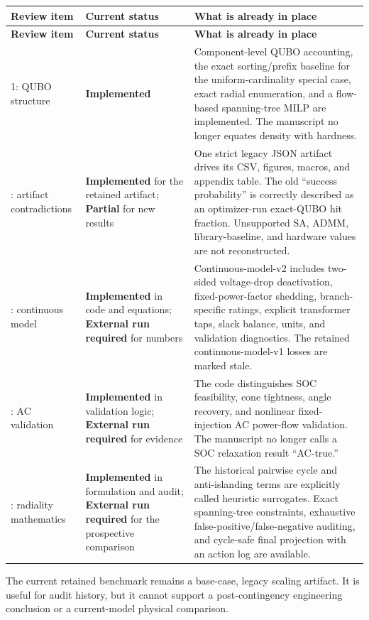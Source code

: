 \documentclass[11pt]{article}
\newcommand{\done}{\textcolor{donegreen}{\textbf{Implemented}}}
\newcommand{\partialstatus}{\textcolor{partialamber}{\textbf{Partial}}}
\newcommand{\external}{\textcolor{externalblue}{\textbf{External run required}}}
\begin{document}
\begin{longtable}{p{}p{}p{}}
\toprule
\textbf{Review item} & \textbf{Current status} & \textbf{What is already in place} \\
\midrule
\endfirsthead
\toprule
\textbf{Review item} & \textbf{Current status} & \textbf{What is already in place} \\
\midrule
\endhead
1: QUBO structure & \done & Component-level QUBO accounting, the exact
sorting/prefix baseline for the uniform-cardinality special case, exact
radial enumeration, and a flow-based spanning-tree MILP are implemented.
The manuscript no longer equates density with hardness. \\
\addlinespace
2: artifact contradictions & \done{} for the retained artifact; \partialstatus{}
for new results & One strict legacy JSON artifact drives its CSV, figures,
macros, and appendix table.  The old ``success probability'' is correctly
described as an optimizer-run exact-QUBO hit fraction.  Unsupported SA,
ADMM, library-baseline, and hardware values are not reconstructed. \\
\addlinespace
3: continuous model & \done{} in code and equations; \external{} for numbers
& Continuous-model-v2 includes two-sided voltage-drop deactivation,
fixed-power-factor shedding, branch-specific ratings, explicit transformer
taps, slack balance, units, and validation diagnostics.  The retained
continuous-model-v1 losses are marked stale. \\
\addlinespace
4: AC validation & \done{} in validation logic; \external{} for evidence &
The code distinguishes SOC feasibility, cone tightness, angle recovery, and
nonlinear fixed-injection AC power-flow validation.  The manuscript no longer
calls a SOC relaxation result ``AC-true.'' \\
\addlinespace
5: radiality mathematics & \done{} in formulation and audit; \external{} for
the prospective comparison & The historical pairwise cycle and
anti-islanding terms are explicitly called heuristic surrogates.  Exact
spanning-tree constraints, exhaustive false-positive/false-negative auditing,
and cycle-safe final projection with an action log are available. \\
\bottomrule
\end{longtable}

The current retained benchmark remains a base-case, legacy scaling artifact.
It is useful for audit history, but it cannot support a post-contingency
engineering conclusion or a current-model physical comparison.
\end{document}
